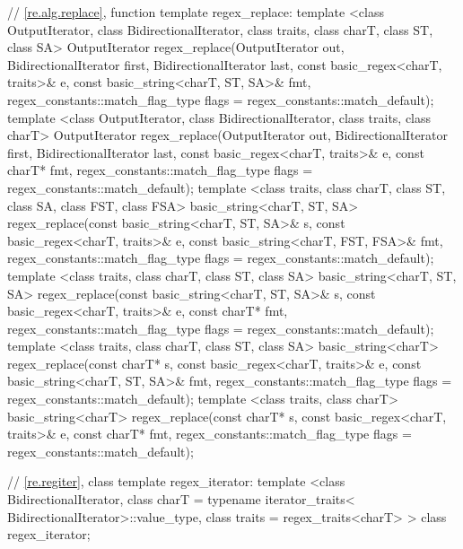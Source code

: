 \begin{codeblock}
{  // \ref{re.alg.replace}, function template regex_replace:
  template <class OutputIterator, class BidirectionalIterator,
      class traits, class charT, class ST, class SA>
    OutputIterator 
    regex_replace(OutputIterator out,
                  BidirectionalIterator first, BidirectionalIterator last,
                  const basic_regex<charT, traits>& e,
                  const basic_string<charT, ST, SA>& fmt,
                  regex_constants::match_flag_type flags =
                    regex_constants::match_default);
  template <class OutputIterator, class BidirectionalIterator,
      class traits, class charT>
    OutputIterator
    regex_replace(OutputIterator out,
                  BidirectionalIterator first, BidirectionalIterator last,
                  const basic_regex<charT, traits>& e,
                  const charT* fmt,
                  regex_constants::match_flag_type flags =
                    regex_constants::match_default);
  template <class traits, class charT, class ST, class SA,
      class FST, class FSA>
    basic_string<charT, ST, SA>
    regex_replace(const basic_string<charT, ST, SA>& s,
                  const basic_regex<charT, traits>& e,
                  const basic_string<charT, FST, FSA>& fmt,
                  regex_constants::match_flag_type flags =
                    regex_constants::match_default);
  template <class traits, class charT, class ST, class SA>
    basic_string<charT, ST, SA>
    regex_replace(const basic_string<charT, ST, SA>& s,
                  const basic_regex<charT, traits>& e,
                  const charT* fmt,
                  regex_constants::match_flag_type flags =
                    regex_constants::match_default);
  template <class traits, class charT, class ST, class SA>
    basic_string<charT>
    regex_replace(const charT* s,
                  const basic_regex<charT, traits>& e,
                  const basic_string<charT, ST, SA>& fmt,
                  regex_constants::match_flag_type flags =
                    regex_constants::match_default);
  template <class traits, class charT>
    basic_string<charT>
    regex_replace(const charT* s,
                  const basic_regex<charT, traits>& e,
                  const charT* fmt,
                  regex_constants::match_flag_type flags =
                    regex_constants::match_default);

  // \ref{re.regiter}, class template regex_iterator:
  template <class BidirectionalIterator, 
            class charT = typename iterator_traits<
              BidirectionalIterator>::value_type,
            class traits = regex_traits<charT> >
    class regex_iterator;

}
\end{codeblock}

